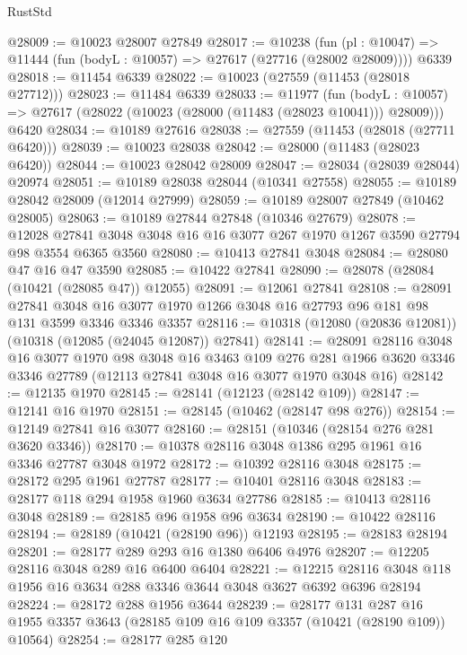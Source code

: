 \begin{lexlean}{RustStd}
\begin{coremodule}
@28009 := @10023 @28007 @27849
@28017 := @10238
    (fun (pl : @10047) => @11444 (fun (bodyL : @10057) => @27617 (@27716 (@28002 @28009))))
    @6339
@28018 := @11454 @6339
@28022 := @10023 (@27559 (@11453 (@28018 @27712)))
@28023 := @11484 @6339
@28033 := @11977
    (fun (bodyL : @10057) => @27617 (@28022 (@10023 (@28000 (@11483 (@28023 @10041))) @28009)))
    @6420
@28034 := @10189 @27616
@28038 := @27559 (@11453 (@28018 (@27711 @6420)))
@28039 := @10023 @28038
@28042 := @28000 (@11483 (@28023 @6420))
@28044 := @10023 @28042 @28009
@28047 := @28034 (@28039 @28044) @20974
@28051 := @10189 @28038 @28044 (@10341 @27558)
@28055 := @10189 @28042 @28009 (@12014 @27999)
@28059 := @10189 @28007 @27849 (@10462 @28005)
@28063 := @10189 @27844 @27848 (@10346 @27679)
@28078 := @12028
    @27841
    @3048
    @3048
    @16
    @16
    @3077
    @267
    @1970
    @1267
    @3590
    @27794
    @98
    @3554
    @6365
    @3560
@28080 := @10413 @27841 @3048
@28084 := @28080 @47 @16 @47 @3590
@28085 := @10422 @27841
@28090 := @28078 (@28084 (@10421 (@28085 @47)) @12055)
@28091 := @12061 @27841
@28108 := @28091
    @27841
    @3048
    @16
    @3077
    @1970
    @1266
    @3048
    @16
    @27793
    @96
    @181
    @98
    @131
    @3599
    @3346
    @3346
    @3357
@28116 := @10318 (@12080 (@20836 @12081)) (@10318 (@12085 (@24045 @12087)) @27841)
@28141 := @28091
    @28116
    @3048
    @16
    @3077
    @1970
    @98
    @3048
    @16
    @3463
    @109
    @276
    @281
    @1966
    @3620
    @3346
    @3346
    @27789
    (@12113 @27841 @3048 @16 @3077 @1970 @3048 @16)
@28142 := @12135 @1970
@28145 := @28141 (@12123 (@28142 @109))
@28147 := @12141 @16 @1970
@28151 := @28145 (@10462 (@28147 @98 @276))
@28154 := @12149 @27841 @16 @3077
@28160 := @28151 (@10346 (@28154 @276 @281 @3620 @3346))
@28170 := @10378 @28116 @3048 @1386 @295 @1961 @16 @3346 @27787 @3048 @1972
@28172 := @10392 @28116 @3048
@28175 := @28172 @295 @1961 @27787
@28177 := @10401 @28116 @3048
@28183 := @28177 @118 @294 @1958 @1960 @3634 @27786
@28185 := @10413 @28116 @3048
@28189 := @28185 @96 @1958 @96 @3634
@28190 := @10422 @28116
@28194 := @28189 (@10421 (@28190 @96)) @12193
@28195 := @28183 @28194
@28201 := @28177 @289 @293 @16 @1380 @6406 @4976
@28207 := @12205 @28116 @3048 @289 @16 @6400 @6404
@28221 := @12215 @28116 @3048 @118 @1956 @16 @3634 @288 @3346 @3644 @3048 @3627 @6392 @6396 @28194
@28224 := @28172 @288 @1956 @3644
@28239 := @28177
    @131
    @287
    @16
    @1955
    @3357
    @3643
    (@28185 @109 @16 @109 @3357 (@10421 (@28190 @109)) @10564)
@28254 := @28177
    @285
    @120

\end{coremodule}
\end{lexlean}
